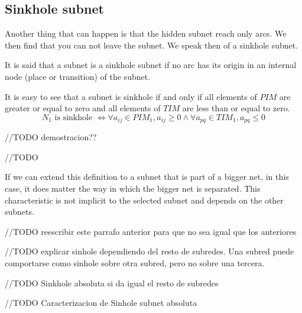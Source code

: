 {\subsection{Sinkhole subnet}

Another thing that can happen is that the hidden subnet reach only arcs. We then find that you can not leave the subnet. We speak then of a sinkhole
subnet.

\begin{definition}
It is said that a subnet is a sinkhole subnet if no arc has its origin in an internal node (place or transition) of the subnet.
\end{definition}

It is easy to see that a subnet is sinkhole if and only if all elements of $PIM$ are greater or equal to zero and all elements of $TIM$ are less than or equal to zero.
\[
N_1\mbox{ is sinkhole } \iff \forall a_{ij} \in PIM_{1}, a_{ij} \geq
0 \land \forall a_{pq} \in TIM_{1}, a_{pq} \leq 0
\]

//TODO demostracion??

\begin{example}
//TODO
\end{example}

If we can extend this definition to a subnet that is part of a bigger net,
in this case, it does matter the way in which the bigger net is separated. This characteristic is not implicit to the selected subnet and depends on the other subnets.

//TODO reescribir este parrafo anterior para que no sea
igual que los anteriores

//TODO explicar sinhole dependiendo del resto de subredes. Una subred puede comportarse como sinhole sobre otra subred, pero no sobre una tercera.

//TODO Sinkhole absoluta si da igual el resto de subredes

//TODO Caracterizacion de Sinhole subnet absoluta

}
